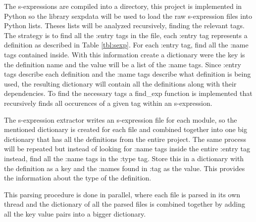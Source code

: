 
The s-expressions are compiled into a directory, this project is implemented in
Python so the library sexpdata will be used to load the raw s-expression files
into Python lists. Theses lists will be analyzed recursively, finding the
relevant tags. The strategy is to find all the :entry tags in the file, each
:entry tag represents a definition as described in Table \ref{tbl:sexp}. For
each :entry tag, find all the :name tags contained inside. With this
information create a dictionary were the key is the definition name and the
value will be a list of the :name tags. Since :entry tags describe each
definition and the :name tags describe what definition is being used, the
resulting dictionary will contain all the definitions along with their
dependencies. To find the necessary tags a \textsf{find\_exp} function is
implemented that recursively finds all occurences of a given tag within an
s-expression.

The s-expression extractor writes an s-expression file for each module, so the
mentioned dictionary is created for each file and combined together into one
big dictionary that has all the definitions from the entire project. The same
process will be repeated but instead of looking for :name tags inside the
entire :entry tag instead, find all the :name tags in the :type tag. Store this
in a dictionary with the definition as a key and the :names found in :tag as
the value. This provides the information about the type of the definition.

This parsing procedure is done in parallel, where each file is parsed in its
own thread and the dictionary of all the parsed files is combined together by
adding all the key value pairs into a bigger dictionary.


